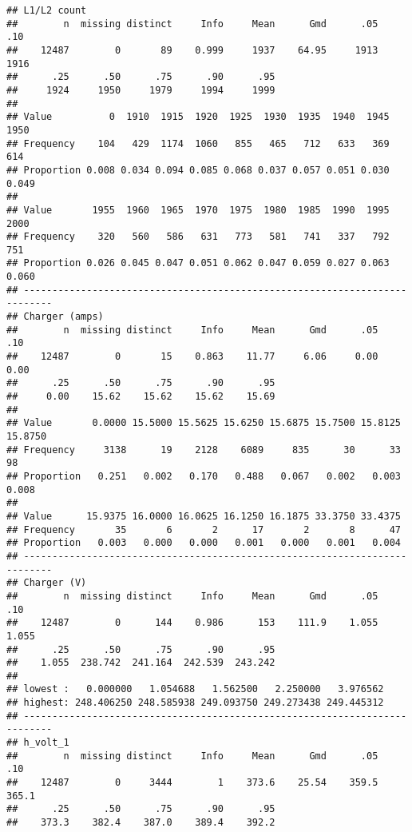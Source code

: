 \documentclass[]{article}
\begin{document}
\begin{verbatim}
## L1/L2 count 
##        n  missing distinct     Info     Mean      Gmd      .05      .10 
##    12487        0       89    0.999     1937    64.95     1913     1916 
##      .25      .50      .75      .90      .95 
##     1924     1950     1979     1994     1999 
##                                                                       
## Value          0  1910  1915  1920  1925  1930  1935  1940  1945  1950
## Frequency    104   429  1174  1060   855   465   712   633   369   614
## Proportion 0.008 0.034 0.094 0.085 0.068 0.037 0.057 0.051 0.030 0.049
##                                                                       
## Value       1955  1960  1965  1970  1975  1980  1985  1990  1995  2000
## Frequency    320   560   586   631   773   581   741   337   792   751
## Proportion 0.026 0.045 0.047 0.051 0.062 0.047 0.059 0.027 0.063 0.060
## ---------------------------------------------------------------------------
## Charger (amps) 
##        n  missing distinct     Info     Mean      Gmd      .05      .10 
##    12487        0       15    0.863    11.77     6.06     0.00     0.00 
##      .25      .50      .75      .90      .95 
##     0.00    15.62    15.62    15.62    15.69 
##                                                                           
## Value       0.0000 15.5000 15.5625 15.6250 15.6875 15.7500 15.8125 15.8750
## Frequency     3138      19    2128    6089     835      30      33      98
## Proportion   0.251   0.002   0.170   0.488   0.067   0.002   0.003   0.008
##                                                                   
## Value      15.9375 16.0000 16.0625 16.1250 16.1875 33.3750 33.4375
## Frequency       35       6       2      17       2       8      47
## Proportion   0.003   0.000   0.000   0.001   0.000   0.001   0.004
## ---------------------------------------------------------------------------
## Charger (V) 
##        n  missing distinct     Info     Mean      Gmd      .05      .10 
##    12487        0      144    0.986      153    111.9    1.055    1.055 
##      .25      .50      .75      .90      .95 
##    1.055  238.742  241.164  242.539  243.242 
## 
## lowest :   0.000000   1.054688   1.562500   2.250000   3.976562
## highest: 248.406250 248.585938 249.093750 249.273438 249.445312
## ---------------------------------------------------------------------------
## h_volt_1 
##        n  missing distinct     Info     Mean      Gmd      .05      .10 
##    12487        0     3444        1    373.6    25.54    359.5    365.1 
##      .25      .50      .75      .90      .95 
##    373.3    382.4    387.0    389.4    392.2 

\end{verbatim}
\end{document}
